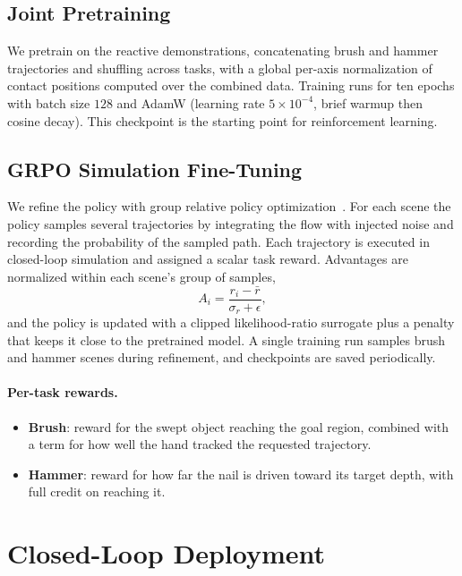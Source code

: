 \documentclass[11pt]{article}
\begin{document}
\subsection{Joint Pretraining}
\label{sec:pretrain}

We pretrain on the reactive demonstrations, concatenating brush and hammer trajectories and shuffling across tasks, with a global per-axis normalization of contact positions computed over the combined data.
Training runs for ten epochs with batch size $128$ and AdamW (learning rate $5{\times}10^{-4}$, brief warmup then cosine decay).
This checkpoint is the starting point for reinforcement learning.

\subsection{GRPO Simulation Fine-Tuning}
\label{sec:grpo}

We refine the policy with group relative policy optimization~\cite{deepseekmath,ppo}.
For each scene the policy samples several trajectories by integrating the flow with injected noise and recording the probability of the sampled path.
Each trajectory is executed in closed-loop simulation and assigned a scalar task reward.
Advantages are normalized within each scene's group of samples,
\begin{equation}
  A_i = \frac{r_i - \bar{r}}{\sigma_r + \epsilon},
\end{equation}
and the policy is updated with a clipped likelihood-ratio surrogate plus a penalty that keeps it close to the pretrained model.
A single training run samples brush and hammer scenes during refinement, and checkpoints are saved periodically.

\paragraph{Per-task rewards.}
\begin{itemize}
  \item \textbf{Brush}: reward for the swept object reaching the goal region, combined with a term for how well the hand tracked the requested trajectory.
  \item \textbf{Hammer}: reward for how far the nail is driven toward its target depth, with full credit on reaching it.
\end{itemize}

\section{Closed-Loop Deployment}
\label{sec:deploy}
\end{document}
